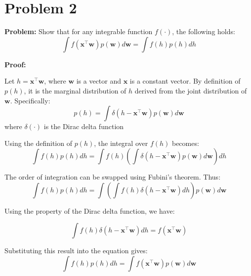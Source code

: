 \documentclass{article}
\begin{document}
\section*{Problem 2}

\textbf{Problem:}  
Show that for any integrable function \(f(\cdot)\), the following holds:  
\[
\int f(\mathbf{x}^\top \mathbf{w}) p(\mathbf{w}) d\mathbf{w} = \int f(h) p(h) dh
\]



\textbf{Proof:}

Let \(h = \mathbf{x}^\top \mathbf{w}\), where \(\mathbf{w}\) is a vector and \(\mathbf{x}\) is a constant vector. By definition of \(p(h)\), it is the marginal distribution of \(h\) derived from the joint distribution of \(\mathbf{w}\). Specifically:
\[
p(h) = \int \delta(h - \mathbf{x}^\top \mathbf{w}) p(\mathbf{w}) d\mathbf{w}
\]
where \(\delta(\cdot)\) is the Dirac delta function

Using the definition of \(p(h)\), the integral over \(f(h)\) becomes:
\[
\int f(h) p(h) dh = \int f(h) \left( \int \delta(h - \mathbf{x}^\top \mathbf{w}) p(\mathbf{w}) d\mathbf{w} \right) dh
\]

The order of integration can be swapped using Fubini’s theorem. Thus:
\[
\int f(h) p(h) dh = \int \left( \int f(h) \delta(h - \mathbf{x}^\top \mathbf{w}) dh \right) p(\mathbf{w}) d\mathbf{w}
\]

Using the property of the Dirac delta function, we have:

\[
\int f(h) \delta(h - \mathbf{x}^\top \mathbf{w}) dh = f(\mathbf{x}^\top \mathbf{w})
\]

Substituting this result into the equation gives:
\[
\int f(h) p(h) dh = \int f(\mathbf{x}^\top \mathbf{w}) p(\mathbf{w}) d\mathbf{w}
\]
\end{document}
